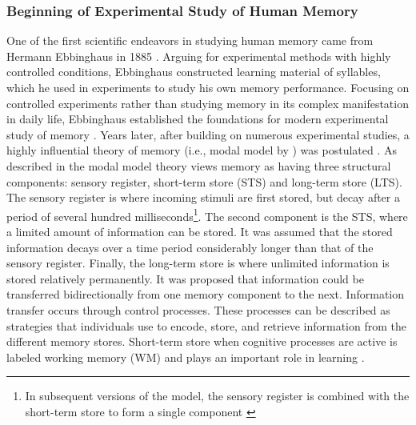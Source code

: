 \subsubsection{Beginning of Experimental Study of Human Memory}
One of the first scientific endeavors in studying human memory came from Hermann Ebbinghaus in 1885 \parencite{ebbinghausUberGedachtnisUntersuchungen1885, kahanaFoundationsHumanMemory2012}. Arguing for experimental methods with highly controlled conditions, Ebbinghaus constructed learning material of syllables, which he used in experiments to study his own memory performance. Focusing on controlled experiments rather than studying memory in its complex manifestation in daily life, Ebbinghaus established the foundations for modern experimental study of memory \parencite{kahanaFoundationsHumanMemory2012}. Years later, after building on numerous experimental studies, a highly influential theory of memory (i.e., modal model by \textcite{atkinsonHumanMemoryProposed1968}) was postulated \parencite{malmberg50YearsResearch2019}. As described in \textcite{atkinsonHumanMemoryProposed1968} the modal model theory views memory as having three structural components: sensory register, short-term store (STS) and long-term store (LTS). The sensory register is where incoming stimuli are first stored, but decay after a period of several hundred milliseconds\footnote{In subsequent versions of the model, the sensory register is combined with the short-term store to form a single component \parencite{atkinsonControlShortTermMemory1971}}. The second component is the STS, where a limited amount of information can be stored. It was assumed that the stored information decays over a time period considerably longer than that of the sensory register. Finally, the long-term store is where unlimited information is stored relatively permanently. It was proposed that information could be transferred bidirectionally from one memory component to the next. Information transfer occurs through control processes. These processes can be described as strategies that individuals use to encode, store, and retrieve information from the different memory stores. Short-term store when cognitive processes are active is labeled working memory (WM) \parencite{atkinsonHumanMemoryProposed1968} and plays an important role in learning \parencite{baddeleyWorkingMemory2010}.

